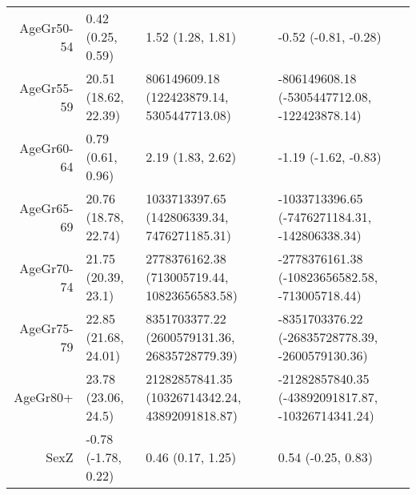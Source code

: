 \begin{table}[ht]
\begin{tabular}{rlll}
  AgeGr50-54 & 0.42 (0.25, 0.59) & 1.52 (1.28, 1.81) & -0.52 (-0.81, -0.28) \\ 
  AgeGr55-59 & 20.51 (18.62, 22.39) & 806149609.18 (122423879.14, 5305447713.08) & -806149608.18 (-5305447712.08, -122423878.14) \\ 
  AgeGr60-64 & 0.79 (0.61, 0.96) & 2.19 (1.83, 2.62) & -1.19 (-1.62, -0.83) \\ 
  AgeGr65-69 & 20.76 (18.78, 22.74) & 1033713397.65 (142806339.34, 7476271185.31) & -1033713396.65 (-7476271184.31, -142806338.34) \\ 
  AgeGr70-74 & 21.75 (20.39, 23.1) & 2778376162.38 (713005719.44, 10823656583.58) & -2778376161.38 (-10823656582.58, -713005718.44) \\ 
  AgeGr75-79 & 22.85 (21.68, 24.01) & 8351703377.22 (2600579131.36, 26835728779.39) & -8351703376.22 (-26835728778.39, -2600579130.36) \\ 
  AgeGr80+ & 23.78 (23.06, 24.5) & 21282857841.35 (10326714342.24, 43892091818.87) & -21282857840.35 (-43892091817.87, -10326714341.24) \\ 
  SexZ & -0.78 (-1.78, 0.22) & 0.46 (0.17, 1.25) & 0.54 (-0.25, 0.83) \\ 
   \hline
\end{tabular}
\end{table}
